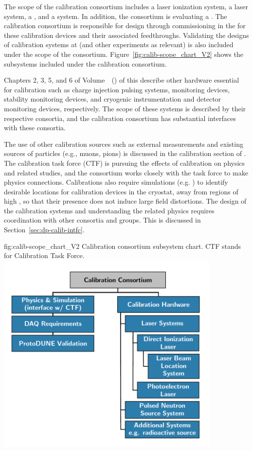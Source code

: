 The scope of the calibration consortium includes a laser ionization system, a \phel laser system, a , and a  system. In addition, the consortium is evaluating a . The calibration consortium is responsible for design through commissioning in the  for these calibration devices and their associated feedthroughs. Validating the designs of calibration systems at  (and other experiments as relevant) is also included under the scope of the consortium. Figure~\ref{fig:calib-scope_chart_V2} shows the subsystems included under the calibration consortium. 

Chapters 2, 3, 5, and 6 of Volume~\volnumberdp~(\voltitledp) of this  describe other hardware essential for calibration such as  charge injection pulsing systems,  monitoring devices,  stability monitoring devices, and cryogenic instrumentation and detector monitoring devices, respectively. The scope of these systems is described by their respective consortia, and the calibration consortium has substantial interfaces with these consortia. 

The use of other calibration sources such as external measurements and existing sources of particles (e.g., muons, pions) is discussed in the calibration section of  \physchtools. The calibration task force (CTF) is pursuing the effects of calibration on physics and related studies, and the consortium works closely with the task force to make physics connections. Calibrations also require simulations (e.g. \efield) to identify desirable locations for calibration devices in the cryostat, away from regions of high \efield, so that their presence does not induce large field distortions. 
The design of the calibration systems and understanding the related physics requires coordination with other consortia and groups. This is discussed in Section~\ref{sec:dp-calib-intfc}.

\begin{dunefigure}{fig:calib-scope_chart_V2}
{Calibration consortium subsystem chart. CTF stands for Calibration Task Force.}
\includegraphics[height=4.0in]{graphics/calib-scope_chart_v3.png}
\end{dunefigure}
